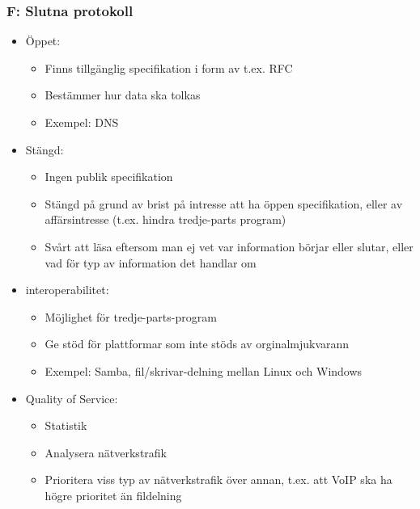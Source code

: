 \documentclass[xetex, 8pt]{beamer}
\begin{document}
    \begin{frame}
        \frametitle{F: Slutna protokoll}
        \begin{itemize}
            \item Öppet:
                \begin{itemize}
                    \item Finns tillgänglig specifikation i form av t.ex. RFC
                    \item Bestämmer hur data ska tolkas
                    \item Exempel: DNS
                \end{itemize}
            \item Stängd:
                \begin{itemize}
                    \item Ingen publik specifikation
                    \item Stängd på grund av brist på intresse att ha öppen
                        specifikation, eller av affärsintresse (t.ex. hindra
                        tredje-parts program)
                    \item Svårt att läsa eftersom man ej vet var information
                        börjar eller slutar, eller vad för typ av information
                        det handlar om
                \end{itemize}
        \end{itemize}

        \begin{itemize}
            \item interoperabilitet:
                \begin{itemize}
                    \item Möjlighet för tredje-parts-program
                    \item Ge stöd för plattformar som inte stöds av
                        orginalmjukvarann
                    \item Exempel: Samba, fil/skrivar-delning mellan
                        Linux och Windows
                \end{itemize}
            \item Quality of Service:
                \begin{itemize}
                    \item Statistik
                    \item Analysera nätverkstrafik
                    \item Prioritera viss typ av nätverkstrafik över annan,
                        t.ex. att VoIP ska ha högre prioritet än fildelning
                \end{itemize}
        \end{itemize}
    \end{frame}
\end{document}
